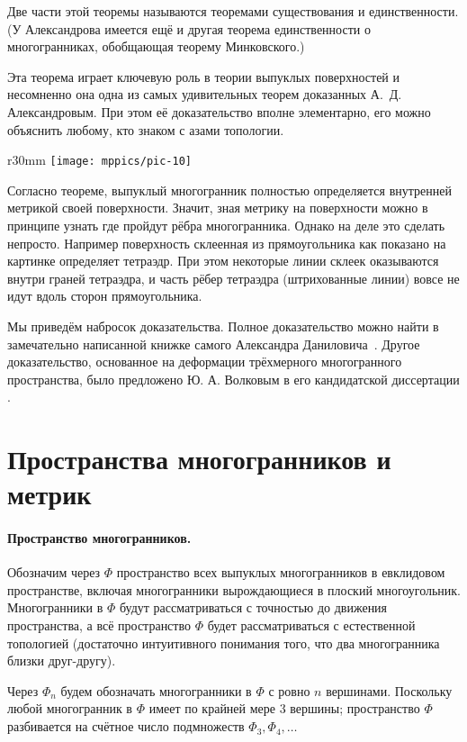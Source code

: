 \documentclass[oneside,a4paper]{article}
\begin{document}
Две части этой теоремы называются теоремами существования и единственности.
(У Александрова имеется ещё и другая теорема единственности о многогранниках, обобщающая теорему Минковского.)

Эта теорема играет ключевую роль в теории выпуклых поверхностей 
и несомненно она одна из самых удивительных теорем доказанных А.~Д. Александровым.
При этом её доказательство вполне элементарно, его можно объяснить любому, кто знаком с азами топологии.

\begin{wrapfigure}{r}{30mm}
\vskip-0mm
\centering
\texttt{[image: mppics/pic-10]}
\vskip-0mm
\end{wrapfigure}

Согласно теореме, выпуклый многогранник полностью определяется внутренней метрикой своей поверхности.
Значит, зная метрику на поверхности можно в принципе узнать где пройдут рёбра многогранника.
Однако на деле это сделать непросто.
Например поверхность склеенная из прямоугольника как показано на картинке определяет тетраэдр.
При этом некоторые линии склеек оказываются внутри граней тетраэдра, и часть рёбер тетраэдра (штрихованные линии) вовсе не идут вдоль сторон прямоугольника.

Мы приведём набросок доказательства. 
Полное доказательство можно найти в замечательно написанной книжке самого Александра Даниловича~\cite{alexandrov}.
Другое доказательство, основанное на деформации трёхмерного многогранного пространства, было предложено Ю. А. Волковым в его кандидатской диссертации \cite{volkov}.


\section{Пространства многогранников и метрик}

\paragraph{Пространство многогранников.}
Обозначим через $\Phi$ пространство всех выпуклых многогранников в евклидовом пространстве, включая многогранники вырождающиеся в плоский многоугольник.
Многогранники в $\Phi$ будут рассматриваться с точностью до движения пространства, а всё пространство $\Phi$ будет рассматриваться с естественной топологией (достаточно интуитивного понимания того, что два многогранника близки друг-другу).

Через $\Phi_n$ будем обозначать многогранники в $\Phi$ с ровно $n$ вершинами.
Поскольку любой многогранник в $\Phi$ имеет по крайней мере 3 вершины;
пространство $\Phi$ разбивается на счётное число подмножеств $\Phi_3,\Phi_4,\dots$
\end{document}

